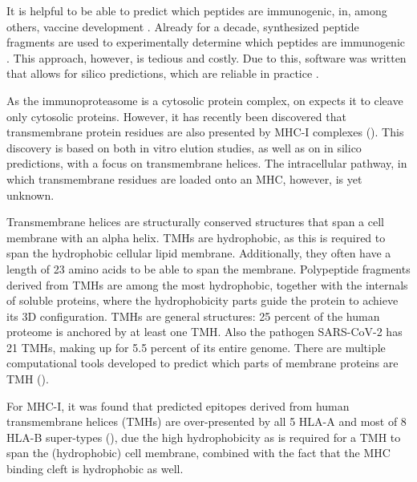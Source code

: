 It is helpful to be able to predict which peptides are immunogenic,
in, among others, vaccine development . 
Already for a decade, synthesized peptide fragments are used
to experimentally determine which peptides
are immunogenic .
This approach, however, is tedious and costly.
Due to this, software was written that allows for silico 
predictions, which are reliable in 
practice \cite{larsen2010identification,schellens2008unanticipated,tang2011genome}.
 

As the immunoproteasome is a cytosolic protein complex, on expects it
to cleave only cytosolic proteins. However, it has recently been
discovered that transmembrane protein residues are also presented
by MHC-I complexes (\cite{bianchi2017}). This discovery is based
on both in vitro elution studies, as well as on in silico predictions,
with a focus on transmembrane helices. 
The intracellular pathway, in which transmembrane residues are loaded onto
an MHC, however, is yet unknown.

Transmembrane helices are structurally conserved structures that span
a cell membrane with an alpha helix.
TMHs are hydrophobic, as this is required to span the 
hydrophobic cellular lipid membrane. Additionally,
they often have a length of 23 amino acids to be able to span
the membrane.
Polypeptide fragments derived from TMHs are among the most hydrophobic,
together with the internals of soluble proteins, where the
hydrophobicity parts guide the protein to achieve its 3D configuration.
TMHs are general structures: 25 percent of the human proteome is
anchored by at least one TMH. Also the pathogen SARS-CoV-2 has 21 TMHs, 
making up for 5.5 percent of its entire genome.
There are multiple computational tools developed to predict which
parts of membrane proteins are TMH (\cite{krogh2001predicting,bianchi2017,kall2004combined,arai2004conpred,jones2007improving,klammer2009metatm,wang2019efficient}).


For MHC-I, it was found that predicted epitopes derived 
from human transmembrane helices (TMHs)
are over-presented by all 5 HLA-A and 
most of 8 HLA-B super-types (\cite{bianchi2017}),
due the high hydrophobicity as is required for a TMH to span
the (hydrophobic) cell membrane, combined with the fact that the MHC
binding cleft is hydrophobic as well.


